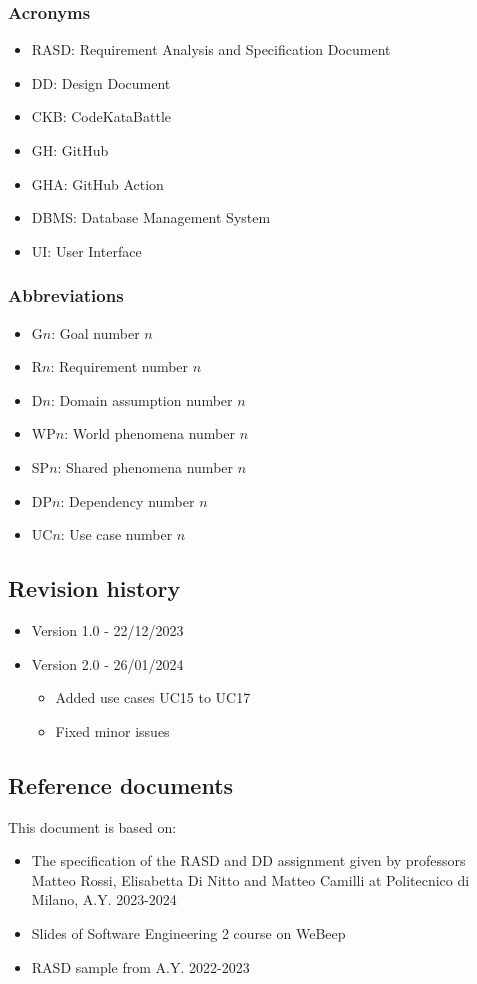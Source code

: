 \subsubsection{Acronyms}
\begin{itemize}
    \item RASD: Requirement Analysis and Specification Document
    \item DD: Design Document
    \item CKB: CodeKataBattle
    \item GH: GitHub
    \item GHA: GitHub Action
    \item DBMS: Database Management System
    \item UI: User Interface
\end{itemize}

\subsubsection{Abbreviations}
\begin{itemize}
    \item G$n$: Goal number $n$
    \item R$n$: Requirement number $n$
    \item D$n$: Domain assumption number $n$
    \item WP$n$: World phenomena number $n$
    \item SP$n$: Shared phenomena number $n$
    \item DP$n$: Dependency number $n$
    \item UC$n$: Use case number $n$
\end{itemize}

\subsection{Revision history}
\begin{itemize}
    \item Version 1.0 - 22/12/2023
    \item Version 2.0 - 26/01/2024
    \begin{itemize}
        \item Added use cases UC15 to UC17
        \item Fixed minor issues
    \end{itemize}
\end{itemize}

\subsection{Reference documents}
This document is based on:
\begin{itemize}
    \item The specification of the RASD and DD assignment given by professors Matteo Rossi, Elisabetta Di Nitto and Matteo Camilli at Politecnico di Milano, A.Y. 2023-2024
    \item Slides of Software Engineering 2 course on WeBeep
    \item RASD sample from A.Y. 2022-2023
\end{itemize}

